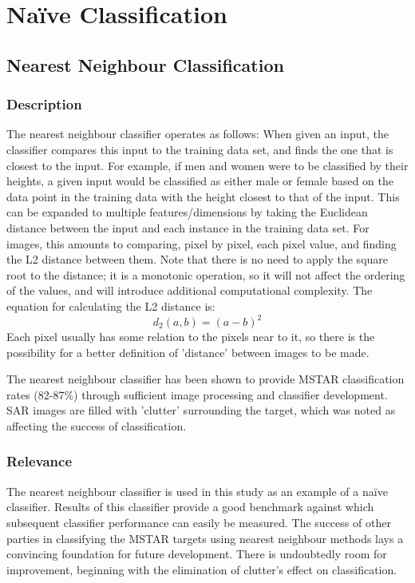 \section{Na{\"i}ve Classification}


\subsection{Nearest Neighbour Classification}\label{lit:nn}
\subsubsection{Description}
The nearest neighbour classifier operates as follows:
When given an input, the classifier compares this input to the training data set, and finds the one that is closest to the input. For example, if men and women were to be classified by their heights, a given input would be classified as either male or female based on the data point in the training data with the height closest to that of the input. This can be expanded to multiple features/dimensions by taking the Euclidean distance between the input and each instance in the training data set. For images, this amounts to comparing, pixel by pixel, each pixel value, and finding the L2 distance between them. Note that there is no need to apply the square root to the distance; it is a monotonic operation, so it will not affect the ordering of the values, and will introduce additional computational complexity. The equation for calculating the L2 distance is:
\[ d_2(a,b) = (a - b)^2  \]
 Each pixel usually has some relation to the pixels near to it, so there is the possibility for a better definition of 'distance' between images to be made\cite{IMED, Michie94machinelearning}.
 
The nearest neighbour classifier has been shown to provide MSTAR classification rates (82-87\%) through sufficient image processing and classifier development. SAR images are filled with 'clutter' surrounding the target, which was noted as affecting the success of classification\cite{Schumacher_atrof}.

\subsubsection{Relevance}
The nearest neighbour classifier is used in this study as an example of a na{\"i}ve classifier. Results of this classifier provide a good benchmark against which subsequent classifier performance can easily be measured. The success of other parties in classifying the MSTAR targets using nearest neighbour methods lays a convincing foundation for future development. There is undoubtedly room for improvement, beginning with the elimination of clutter's effect on classification.

